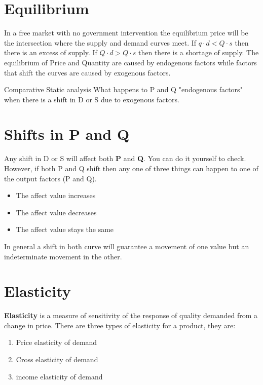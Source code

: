 \documentclass[../ECON-281-Notes.tex]{subfiles}
\begin{document}
\section{Equilibrium}
In a free market with no government intervention the equilibrium price will be the intersection where the supply and demand curves meet.
If $q\cdot d < Q\cdot s$ then there is an excess of supply. If $Q\cdot  d > Q\cdot  s$ then there is a shortage of supply. 
The equilibrium of Price and Quantity are caused by endogenous factors while factors that shift the curves are caused by exogenous factors.

\begin{DndSidebar}[color=PhbLightGreen]{Comparative Static analysis }
  What happens to P and Q "endogenous factors" when there is a shift in D or S due to exogenous factors.
\end{DndSidebar}

\section{Shifts in P and Q}
Any shift in D or S will affect both \textbf{P} and \textbf{Q}.
You can do it yourself to check.
However, if both P and Q shift then any one of three things can happen to one of the output factors (P and Q).
\begin{itemize}
  \item The affect value increases
  \item The affect value decreases
  \item The affect value stays the same  
\end{itemize}
In general a shift in both curve will guarantee a movement of one value but an indeterminate movement in the other.

\section{Elasticity}
\textbf{Elasticity} is a measure of sensitivity of the response of quality demanded from a change in price.
There are three types of elasticity for a product, they are:
\begin{enumerate}
  \item Price elasticity of demand
  \item Cross elasticity of demand
  \item income elasticity of demand
\end{enumerate}
\end{document}
